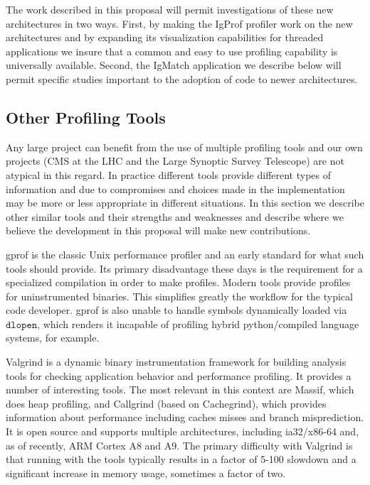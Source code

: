 \documentclass[notitlepage,letter,12pt]{article}
\begin{document}
The work described in this proposal will permit investigations of these
new architectures in two ways. First, by making the IgProf profiler
work on the new architectures and by expanding its visualization 
capabilities for threaded applications we insure that a common and
easy to use profiling capability is universally available.
Second, the IgMatch application we describe below will permit specific
studies important to the adoption of code to newer architectures.

\subsection{Other Profiling Tools}

Any large project can benefit from the use of multiple profiling tools
and our own projects (CMS at the LHC and the Large
Synoptic Survey Telescope) are not atypical in this regard. In practice 
different tools provide different types of information and due to compromises 
and choices made in the implementation may be more or less appropriate in 
different situations. In this section we describe other similar tools and 
their strengths and weaknesses and describe where we believe the development 
in this proposal will make new contributions.

gprof is the classic Unix performance profiler and an
early standard for what such tools should provide. Its primary
disadvantage these days is the requirement for a specialized compilation
in order to make profiles.  Modern tools provide profiles for
uninstrumented binaries. This simplifies greatly the workflow for
the typical code developer. gprof is also unable to handle symbols
dynamically loaded via $\texttt{dlopen}$, which renders it incapable
of profiling hybrid python/compiled language systems, for example.  

Valgrind \cite{VALGRIND,VALGRINDPAPER} is a dynamic binary
instrumentation framework for building analysis tools for checking
application behavior and performance profiling. It provides a number
of interesting tools.  The most relevant in this context are Massif,
which does heap profiling, and Callgrind (based on Cachegrind),
which provides information about performance including
caches misses and branch misprediction.  It is open source and
supports multiple architectures, including ia32/x86-64 and, as of
recently, ARM Cortex A8 and A9. The primary difficulty with Valgrind
is that running with the tools typically results in a factor of
5-100 slowdown and a significant increase in memory usage, sometimes
a factor of two.
\end{document}
